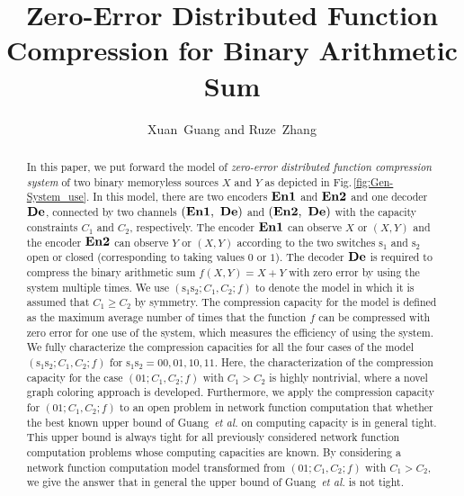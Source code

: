 \documentclass[11pt,draftclsnofoot,onecolumn]{IEEEtran}
\newcommand{\Enone}{\bf{En1}}
\newcommand{\Entwo}{\bf{En2}}
\newcommand{\De}{\bf{De}}
\begin{document}
%
	
\title{Zero-Error Distributed Function Compression for Binary Arithmetic Sum}

\author{Xuan~Guang and Ruze~Zhang
}

\maketitle

	\begin{abstract}
In this paper, we put forward the model of \emph{zero-error distributed function compression system} of two binary memoryless sources $X$ and $Y$ as depicted in Fig.\,\ref{fig:Gen-System_use}. In this model, there are two encoders $\Enone$ and $\Entwo$ and one decoder $\De$, connected by two channels $(\Enone,~\De)$ and $(\Entwo,~\De)$ with the capacity constraints $C_1$ and $C_2$, respectively. The encoder $\Enone$ can observe $X$ or $(X,Y)$ and the encoder $\Entwo$ can observe $Y$ or $(X,Y)$ according to the two switches $\boldsymbol{\mathrm{s}}_1$ and $\boldsymbol{\mathrm{s}}_2$ open or closed (corresponding to taking values $0$ or $1$). The decoder $\De$ is required to compress the binary arithmetic sum $f(X,Y)=X+Y$ with zero error by using the system multiple times. We use $(\boldsymbol{\mathrm{s}}_1\boldsymbol{\mathrm{s}}_2;C_{1}, C_{2}; f)$ to denote the model in which it is assumed that $C_1\geq C_2$ by symmetry. The compression capacity for the model is defined as the maximum average number of times that the function $f$ can be compressed with zero error for one use of the system, which measures the efficiency of using the system. We fully characterize the compression capacities for all the four cases of the model $(\boldsymbol{\mathrm{s}}_1\boldsymbol{\mathrm{s}}_2;C_{1}, C_{2}; f)$ for $\boldsymbol{\mathrm{s}}_1\boldsymbol{\mathrm{s}}_2=00,01,10,11$. Here, the characterization of the compression capacity for the case  $(01;C_1,C_2;f)$ with $C_1>C_2$ is highly nontrivial, where  a novel graph coloring approach is developed.
Furthermore, we apply the compression capacity for  $(01;C_1,C_2;f)$ to an open problem in network function computation that whether the best known upper bound of Guang~\emph{et al.} on computing capacity is in general tight. This upper bound is always tight for all previously considered network function computation problems whose computing capacities are known. By considering a network function computation model transformed from $(01;C_1,C_2;f)$ with $C_1>C_2$, we give the answer that in general the upper bound of Guang~\emph{et al.} is not tight.
\end{abstract}
\end{document}
